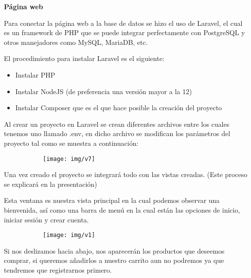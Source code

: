 \documentclass[letterpaper,12pt]{article}
\begin{document}
	\textbf{Página web}
	
	Para conectar la página web a la base de datos se hizo el uso de Laravel, el cual es un framework de PHP que se puede integrar perfectamente con PostgreSQL y otros manejadores como MySQL, MariaDB, etc.
	
	El procedimiento para instalar Laravel es el siguiente:
	
	\begin{itemize}
		\item Instalar PHP
		\item Instalar NodeJS (de preferencia una versión mayor a la 12)
		\item Instalar Composer que es el que hace posible la creación del proyecto
	\end{itemize}

	
	Al crear un proyecto en Laravel se crean diferentes archivos entre los cuales tenemos uno llamado .env, en dicho archivo se modifican los parámetros del proyecto tal como se muestra a continuación:
	
	\begin{figure}[H]

		\begin{subfigure}{20cm}

			\centering

			\texttt{[image: img/v7]}

		\end{subfigure}

	\end{figure}

	Una vez creado el proyecto se integrará todo con las vistas creadas. (Este proceso se explicará en la presentación)
	
	Esta ventana es nuestra vista principal en la cual podemos observar una bienvenida, así como una barra de menú en la cual están las opciones de inicio, iniciar sesión y crear cuenta.
	
	\begin{figure}[H]

		\begin{subfigure}{20cm}

			\centering

			\texttt{[image: img/v1]}

		\end{subfigure}

	\end{figure}

	Si nos deslizamos hacia abajo, nos aparecerán los productos que deseemos comprar, si queremos añadirlos a nuestro carrito aun no podremos ya que tendremos que registrarnos primero.
	
\end{document}
